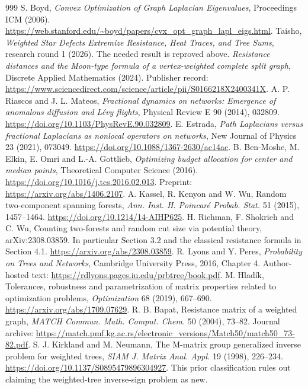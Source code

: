 \documentclass[11pt,a4paper]{article}
\theoremstyle{definition}\newtheorem{definition}[theorem]{Definition}
\theoremstyle{remark}\newtheorem{remark}[theorem]{Remark}
\numberwithin{equation}{section}
\begin{document}
\begin{thebibliography}{999}
 S. Boyd, \emph{Convex Optimization of Graph Laplacian Eigenvalues}, Proceedings ICM (2006). \url{https://web.stanford.edu/~boyd/papers/cvx_opt_graph_lapl_eigs.html}.
 Taisho, \emph{Weighted Star Defects Extremize Resistance, Heat Traces, and Tree Sums}, research round 1 (2026). The needed result is reproved above.
 \emph{Resistance distances and the Moon-type formula of a vertex-weighted complete split graph}, Discrete Applied Mathematics (2024). Publisher record: \url{https://www.sciencedirect.com/science/article/pii/S0166218X2400341X}.
 A. P. Riascos and J. L. Mateos, \emph{Fractional dynamics on networks: Emergence of anomalous diffusion and L\'evy flights}, Physical Review E 90 (2014), 032809. \url{https://doi.org/10.1103/PhysRevE.90.032809}.
 E. Estrada, \emph{Path Laplacians versus fractional Laplacians as nonlocal operators on networks}, New Journal of Physics 23 (2021), 073049. \url{https://doi.org/10.1088/1367-2630/ac14ac}.
 B. Ben-Moshe, M. Elkin, E. Omri and L.-A. Gottlieb, \emph{Optimizing budget allocation for center and median points}, Theoretical Computer Science (2016). \url{https://doi.org/10.1016/j.tcs.2016.02.013}. Preprint: \url{https://arxiv.org/abs/1406.2107}.
 A. Kassel, R. Kenyon and W. Wu, Random two-component spanning forests, \emph{Ann. Inst. H. Poincar\'e Probab. Stat.} 51 (2015), 1457--1464. \url{https://doi.org/10.1214/14-AIHP625}.
 H. Richman, F. Shokrieh and C. Wu, Counting two-forests and random cut size via potential theory, arXiv:2308.03859. In particular Section 3.2 and the classical resistance formula in Section 4.1. \url{https://arxiv.org/abs/2308.03859}.
 R. Lyons and Y. Peres, \emph{Probability on Trees and Networks}, Cambridge University Press, 2016, Chapter 4. Author-hosted text: \url{https://rdlyons.pages.iu.edu/prbtree/book.pdf}.
 M. Hlad\'ik, Tolerances, robustness and parametrization of matrix properties related to optimization problems, \emph{Optimization} 68 (2019), 667--690. \url{https://arxiv.org/abs/1709.07629}.
 R. B. Bapat, Resistance matrix of a weighted graph, \emph{MATCH Commun. Math. Comput. Chem.} 50 (2004), 73--82. Journal archive: \url{https://match.pmf.kg.ac.rs/electronic_versions/Match50/match50_73-82.pdf}.
 S. J. Kirkland and M. Neumann, The M-matrix group generalized inverse problem for weighted trees, \emph{SIAM J. Matrix Anal. Appl.} 19 (1998), 226--234. \url{https://doi.org/10.1137/S0895479896304927}. This prior classification rules out claiming the weighted-tree inverse-sign problem as new.

\end{thebibliography}
\end{document}
